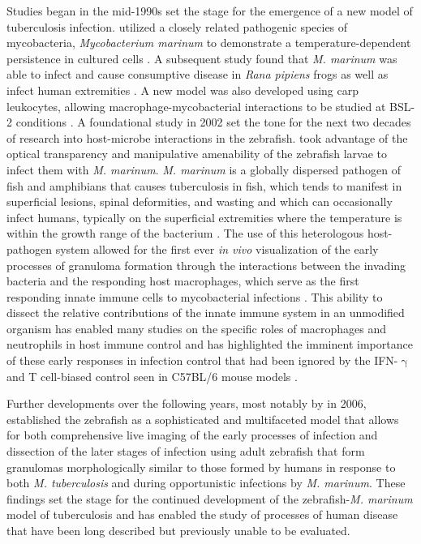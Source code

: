 Studies began in the mid-1990s set the stage for the emergence of a new model of tuberculosis infection. \citeauthor{Ramakrishnan1994} utilized a closely related pathogenic species of mycobacteria, \textit{Mycobacterium marinum} to demonstrate a temperature-dependent persistence in cultured cells \citep{Tobin2008}. A subsequent study found that \textit{M. marinum} was able to infect and cause consumptive disease in \textit{Rana pipiens} frogs as well as infect human extremities \citep{Ramakrishnan1997a, Ramakrishnan1997b, Cosma2006}. A new model was also developed using carp leukocytes, allowing macrophage-mycobacterial interactions to be studied at BSL-2 conditions \citep{ElEtr2001}. A foundational study in 2002 set the tone for the next two decades of research into host-microbe interactions in the zebrafish. \citeauthor{Davis2002} took advantage of the optical transparency and manipulative amenability of the zebrafish larvae to infect them with \textit{M. marinum}. \textit{M. marinum} is a globally dispersed pathogen of fish and amphibians that causes tuberculosis in fish, which tends to manifest in superficial lesions, spinal deformities, and wasting and which can occasionally infect humans, typically on the superficial extremities where the temperature is within the growth range of the bacterium \citep{Hashish2018, Aronson1926, Gray1990, Parisot1958}. The use of this heterologous host-pathogen system allowed for the first ever \textit{in vivo} visualization of the early processes of granuloma formation through the interactions between the invading bacteria and the responding host macrophages, which serve as the first responding innate immune cells to mycobacterial infections \citep{Davis2002, Davis2009}. This ability to dissect the relative contributions of the innate immune system in an unmodified organism has enabled many studies on the specific roles of macrophages and neutrophils in host immune control and has highlighted the imminent importance of these early responses in infection control that had been ignored by the IFN-$\upgamma$ and T cell-biased control seen in C57BL/6 mouse models \citep{Lesley2008}.

Further developments over the following years, most notably by \citeauthor{Swaim2006} in 2006, established the zebrafish as a sophisticated and multifaceted model that allows for both comprehensive live imaging of the early processes of infection and dissection of the later stages of infection using adult zebrafish that form granulomas morphologically similar to those formed by humans in response to both \textit{M. tuberculosis} and during opportunistic infections by \textit{M. marinum}. These findings set the stage for the continued development of the zebrafish-\textit{M. marinum} model of tuberculosis and has enabled the study of processes of human disease that have been long described but previously unable to be evaluated.

